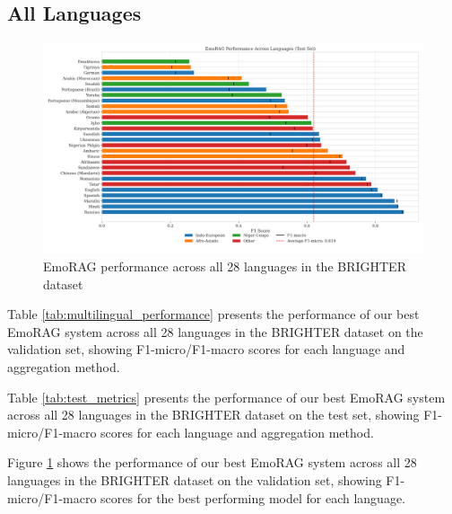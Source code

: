 \documentclass[a4paper,12pt]{extarticle}
\begin{document}
\subsection{All Languages}

\begin{figure}[h]
    \centering
    \includegraphics[width=1\textwidth]{emorag_by_language.png}
    \caption{EmoRAG performance across all 28 languages in the BRIGHTER dataset}
    \label{fig:emorag_by_language}
\end{figure}


Table \ref{tab:multilingual_performance} presents the performance of our best EmoRAG system across all 28 languages in the BRIGHTER dataset on the validation set, showing F1-micro/F1-macro scores for each language and aggregation method.

Table \ref{tab:test_metrics} presents the performance of our best EmoRAG system across all 28 languages in the BRIGHTER dataset on the test set, showing F1-micro/F1-macro scores for each language and aggregation method.

Figure \ref{fig:emorag_by_language} shows the performance of our best EmoRAG system across all 28 languages in the BRIGHTER dataset on the validation set, showing F1-micro/F1-macro scores for the best performing model for each language.
\end{document}
